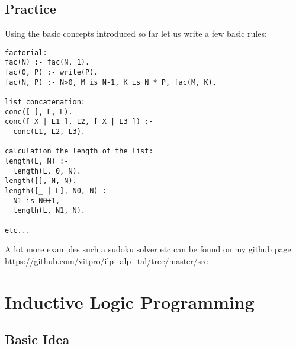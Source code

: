 \documentclass[11pt]{article}
\begin{document}
\subsection{Practice}
Using the basic concepts introduced so far let us write a few basic rules:
\begin{lstlisting}
factorial:
fac(N) :- fac(N, 1).
fac(0, P) :- write(P).
fac(N, P) :- N>0, M is N-1, K is N * P, fac(M, K).

list concatenation:
conc([ ], L, L).
conc([ X | L1 ], L2, [ X | L3 ]) :- 
  conc(L1, L2, L3).

calculation the length of the list:
length(L, N) :-
  length(L, 0, N).
length([], N, N).
length([_ | L], N0, N) :-
  N1 is N0+1,
  length(L, N1, N).

etc...
\end{lstlisting}
A lot more examples such a sudoku solver etc can be found on my github page \url{https://github.com/vitpro/ilp_alp_tal/tree/master/src}


\section{Inductive Logic Programming}

\subsection{Basic Idea}
\end{document}
